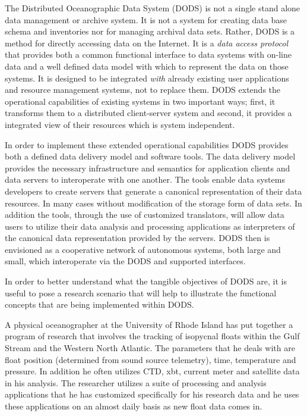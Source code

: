 \noindent The Distributed Oceanographic Data System (DODS) is not a single
stand alone data management or archive system.  It is not a system for
creating data base schema and inventories nor for managing archival
data sets.  Rather, DODS is a method for directly accessing data on the
Internet.  It is a {\em data access protocol} that provides both a common
functional interface to data systems with on-line data and a well
defined data model with which to represent the data on those systems.  It is
designed to be integrated {\em with\/} already existing user applications and
resource management systems, not to replace them.  DODS extends the
operational capabilities of existing systems in two important ways; first, it
transforms them to a distributed client-server system and second, it provides
a integrated view of their resources which is system independent.

In order to implement these extended operational capabilities DODS provides
both a defined data delivery model and software tools.  The data delivery
model provides the necessary infrastructure and semantics for application
clients and data servers to interoperate with one another.  The tools enable
data systems developers to create servers that generate a canonical
representation of their data resources. In many cases without modification of
the storage form of data sets.  In addition the tools, through the use of
customized translators, will allow data users to utilize their data analysis
and processing applications as interpreters of the canonical data
representation provided by the servers. DODS then is envisioned as a
cooperative network of autonomous systems, both large and small, which
interoperate via the DODS \dap and supported interfaces.

In order to better understand what the tangible objectives of DODS are, it is
useful to pose a research scenario that will help to illustrate the
functional concepts that are being implemented within DODS.

A physical oceanographer at the University of Rhode Island has put together a
program of research that involves the tracking of isopycnal floats within the
Gulf Stream and the Western North Atlantic.  The parameters that he deals
with are float position (determined from sound source telemetry), time,
temperature and pressure.  In addition he often utilizes CTD, xbt, current
meter and satellite data in his analysis.  The researcher utilizes a suite of
processing and analysis applications that he has customized specifically for
his research data and he uses these applications on an almost daily basis as
new float data comes in.

